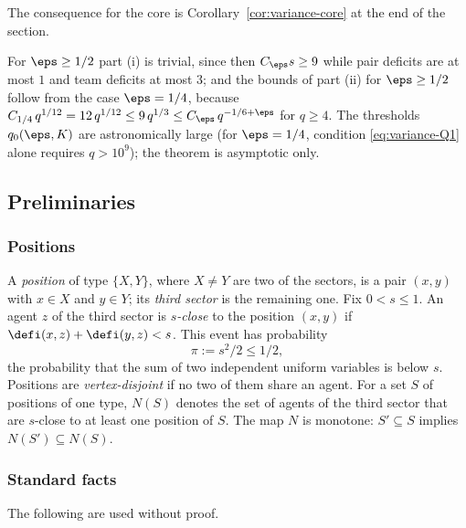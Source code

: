 The consequence for the core is Corollary~\ref{cor:variance-core} at the end of the
section.

\begin{remark}\label{rem:variance-range}
For $\eps\ge1/2$ part (i) is trivial, since then $C_\eps s\ge 9$ while pair deficits are at
most $1$ and team deficits at most $3$; and the bounds of part (ii) for $\eps\ge1/2$ follow
from the case $\eps=1/4$, because $C_{1/4}\,q^{1/12}=12\,q^{1/12}\le 9\,q^{1/3}\le
C_\eps\,q^{-1/6+\eps}$ for $q\ge4$. The thresholds $q_0(\eps,K)$ are astronomically large
(for $\eps=1/4$, condition \eqref{eq:variance-Q1} alone requires $q>10^9$); the theorem is
asymptotic only.
\end{remark}

\subsection{Preliminaries}\label{sec:variance-prelim}

\subsubsection*{Positions}
A \emph{position} of type $\{X,Y\}$, where $X\ne Y$ are two of the sectors, is a pair
$(x,y)$ with $x\in X$ and $y\in Y$; its \emph{third sector} is the remaining one. Fix
$0<s\le1$. An agent $z$ of the third sector is \emph{$s$-close} to the position $(x,y)$ if
$\defi(x,z)+\defi(y,z)<s$. This event has probability
\[
\pi:=s^2/2\le1/2 ,
\]
the probability that the sum of two independent uniform variables is below $s$. Positions
are \emph{vertex-disjoint} if no two of them share an agent. For a set $S$ of positions of
one type, $N(S)$ denotes the set of agents of the third sector that are $s$-close to at
least one position of $S$. The map $N$ is monotone: $S'\subseteq S$ implies
$N(S')\subseteq N(S)$.

\subsubsection*{Standard facts}
The following are used without proof.

